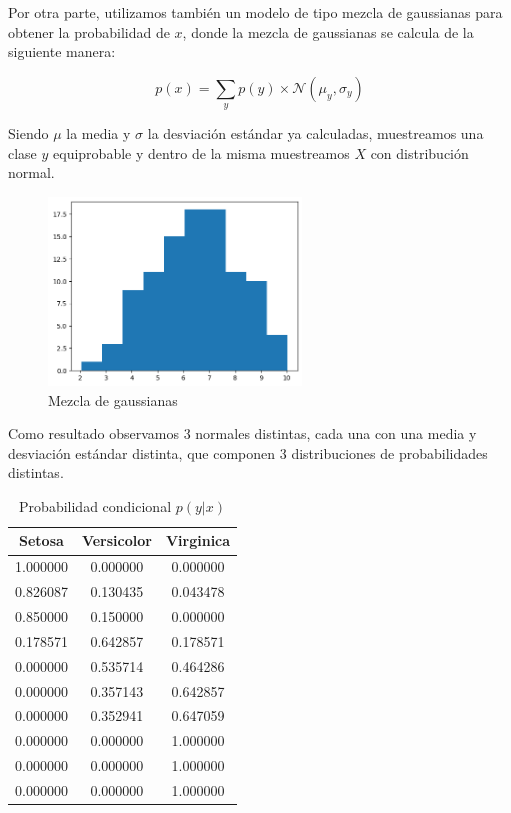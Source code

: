 \documentclass[11pt]{article}
\begin{document}
Por otra parte, utilizamos también un modelo de tipo mezcla de gaussianas para obtener la probabilidad de $x$, donde la mezcla de gaussianas se calcula de la siguiente manera:

$$
p(x) = \sum_y p(y) \times \mathcal{N}(\mu_y, \sigma_y)
$$ 

Siendo $\mu$ la media y $\sigma$ la desviación estándar ya calculadas, muestreamos una clase $y$ equiprobable y dentro de la misma muestreamos $X$ con distribución normal. 

\begin{figure}[h]
    \centering
    \includegraphics[width=0.6\textwidth]{notebooks_clase_1/mix_gaussians.png}
    \caption{Mezcla de gaussianas}
    \label{fig:mix-gaussians}
\end{figure}

Como resultado observamos 3 normales distintas, cada una con una media y desviación estándar distinta, que componen 3 distribuciones de probabilidades distintas. 

\begin{table}[h]
\centering
\begin{tabular}{c|c|c}
\textbf{Setosa}                   & \textbf{Versicolor}               &  \textbf{Virginica} \\ \hline \hline
        1.000000 & 0.000000 & 0.000000 \\
        0.826087 & 0.130435 & 0.043478 \\
        0.850000 & 0.150000 & 0.000000 \\
        0.178571 & 0.642857 & 0.178571 \\
        0.000000 & 0.535714 & 0.464286 \\
        0.000000 & 0.357143 & 0.642857 \\
        0.000000 & 0.352941 & 0.647059 \\
        0.000000 & 0.000000 & 1.000000 \\
        0.000000 & 0.000000 & 1.000000 \\
        0.000000 & 0.000000 & 1.000000 \\
    \end{tabular}
    \caption{Probabilidad condicional $p(y|x)$}
    \label{tab:cond_yx}
\end{table}
\end{document}
